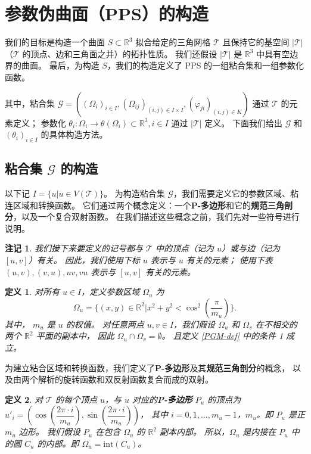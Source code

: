 \documentclass{ctexart}
\newtheorem{Def}{定义}
\newtheorem{Rmk}{注记}
\begin{document}
\section{参数伪曲面（PPS）的构造}
	我们的目标是构造一个曲面 $S\subset \mathbb{R}^3$ 拟合给定的三角网格 $\mathcal{T}$
	且保持它的基空间 $|\mathcal{T}|$ （$\mathcal{T}$ 的顶点、边和三角面之并）的拓扑性质。
	我们还假设 $|\mathcal{T}|$ 是 $\mathbb{R}^3$ 中具有空边界的曲面。
	最后，为构造 $S$，我们的构造定义了 PPS 的一组粘合集和一组参数化函数。

	其中，粘合集
	$\mathcal{G} = ((\Omega_i)_{i\in I},(\Omega_{ij})_{(i,j)\in I\times I},(\varphi_{ji})_{(i,j)\in K})$
	通过 $\mathcal{T}$ 的元素定义；
	参数化 $\theta_i:\Omega_i\rightarrow \theta(\Omega_i)\subset \mathbb{R}^3,i\in I$
	通过 $|\mathcal{T}|$ 定义。
	下面我们给出 $\mathcal{G}$ 和 $(\theta_i)_{i\in I}$ 的具体构造方法。

	\subsection{粘合集 $\mathcal{G}$ 的构造}
		以下记 $I=\{u|u \in V(\mathcal{T})\}$。
		为构造粘合集 $\mathcal{G}$，我们需要定义它的参数区域、粘连区域和转换函数。
		它们通过两个概念定义：一个\textbf{P-多边形}和它的\textbf{规范三角剖分}，以及一个复合双射函数。
		在我们描述这些概念之前，我们先对一些符号进行说明。

		\begin{Rmk}
			我们接下来要定义的记号都与 $\mathcal{T}$ 中的顶点（记为 $u$）或与边（记为 $[u,v]$）有关。
			因此，我们使用下标 $u$ 表示与 $u$ 有关的元素；
			使用下表 $(u,v),(v,u),uv,vu$ 表示与 $[u,v]$ 有关的元素。
		\end{Rmk}

		\begin{Def}\label{PD-def}
			对所有 $u\in I$，定义参数区域 $\Omega_u$ 为
			\begin{equation}
				\Omega_u=\{(x,y)\in \mathbb{R}^2|x^2+y^2<\cos^2(\dfrac{\pi}{m_u})\}.
			\end{equation}
			其中， $m_u$ 是 $u$ 的权值。
			对任意两点 $u,v\in I$，我们假设 $\Omega_u$ 和 $\Omega_v$ 在不相交的两个 $\mathbb{R}^2$ 平面的副本中，
			因此 $\Omega_u\cap \Omega_v=\emptyset$。
			且定义 \ref{PGM-def} 中的条件 1 成立。
		\end{Def}
		
		为建立粘合区域和转换函数，我们定义了\textbf{P-多边形}及其\textbf{规范三角剖分}的概念，
		以及由两个解析的旋转函数和双反射函数复合而成的双射。
		\begin{Def}
			对 $\mathcal{T}$ 的每个顶点 $u$，与 $u$ 对应的\textbf{P-多边形} $P_u$ 的顶点为
			$u'_i=(\cos(\dfrac{2\pi \cdot i}{m_u}),\sin(\dfrac{2\pi \cdot i}{m_u}))$，
			其中 $i=0,1,\dots,m_u-1$，$m_u$。即 $P_u$ 是正 $m_u$ 边形。
			我们假设 $P_u$ 在包含 $\Omega_u$ 的 $\mathbb{R}^2$ 副本内部。
			所以，$\Omega_u$ 是内接在 $P_u$ 中的圆 $C_u$ 的内部。即 $\Omega_u = \text{int}(C_u)$。
		\end{Def}
\end{document}
